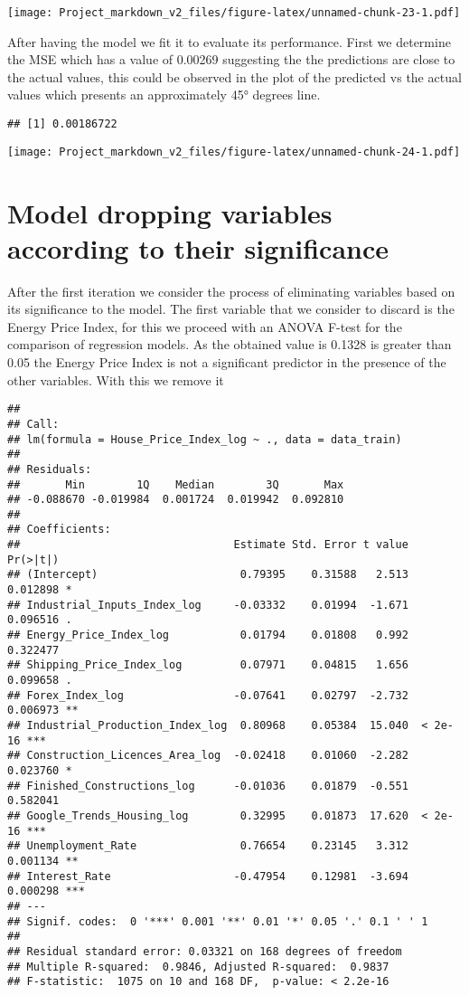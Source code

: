 \documentclass[
]{article}
\begin{document}
\texttt{[image: Project\_markdown\_v2\_files/figure-latex/unnamed-chunk-23-1.pdf]}

After having the model we fit it to evaluate its performance. First we
determine the MSE which has a value of 0.00269 suggesting the the
predictions are close to the actual values, this could be observed in
the plot of the predicted vs the actual values which presents an
approximately 45° degrees line.

\begin{verbatim}
## [1] 0.00186722
\end{verbatim}

\texttt{[image: Project\_markdown\_v2\_files/figure-latex/unnamed-chunk-24-1.pdf]}

\section{Model dropping variables according to their
significance}\label{model-dropping-variables-according-to-their-significance}

After the first iteration we consider the process of eliminating
variables based on its significance to the model. The first variable
that we consider to discard is the Energy Price Index, for this we
proceed with an ANOVA F-test for the comparison of regression models. As
the obtained value is 0.1328 is greater than 0.05 the Energy Price Index
is not a significant predictor in the presence of the other variables.
With this we remove it

\begin{verbatim}
## 
## Call:
## lm(formula = House_Price_Index_log ~ ., data = data_train)
## 
## Residuals:
##       Min        1Q    Median        3Q       Max 
## -0.088670 -0.019984  0.001724  0.019942  0.092810 
## 
## Coefficients:
##                                 Estimate Std. Error t value Pr(>|t|)    
## (Intercept)                      0.79395    0.31588   2.513 0.012898 *  
## Industrial_Inputs_Index_log     -0.03332    0.01994  -1.671 0.096516 .  
## Energy_Price_Index_log           0.01794    0.01808   0.992 0.322477    
## Shipping_Price_Index_log         0.07971    0.04815   1.656 0.099658 .  
## Forex_Index_log                 -0.07641    0.02797  -2.732 0.006973 ** 
## Industrial_Production_Index_log  0.80968    0.05384  15.040  < 2e-16 ***
## Construction_Licences_Area_log  -0.02418    0.01060  -2.282 0.023760 *  
## Finished_Constructions_log      -0.01036    0.01879  -0.551 0.582041    
## Google_Trends_Housing_log        0.32995    0.01873  17.620  < 2e-16 ***
## Unemployment_Rate                0.76654    0.23145   3.312 0.001134 ** 
## Interest_Rate                   -0.47954    0.12981  -3.694 0.000298 ***
## ---
## Signif. codes:  0 '***' 0.001 '**' 0.01 '*' 0.05 '.' 0.1 ' ' 1
## 
## Residual standard error: 0.03321 on 168 degrees of freedom
## Multiple R-squared:  0.9846, Adjusted R-squared:  0.9837 
## F-statistic:  1075 on 10 and 168 DF,  p-value: < 2.2e-16
\end{verbatim}
\end{document}
